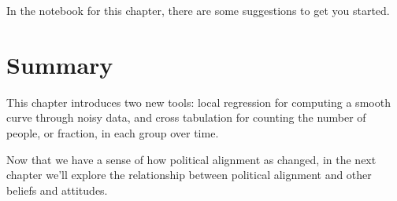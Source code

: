 In the notebook for this chapter, there are some suggestions to get you
started.

\section{Summary}\label{summary}

This chapter introduces two new tools: local regression for computing a
smooth curve through noisy data, and cross tabulation for counting the
number of people, or fraction, in each group over time.

Now that we have a sense of how political alignment as changed, in the
next chapter we'll explore the relationship between political alignment
and other beliefs and attitudes.

